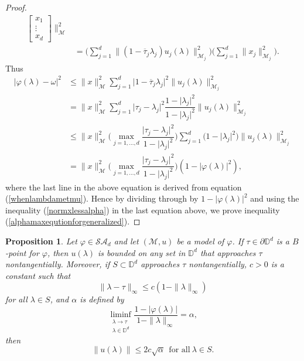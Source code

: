 \documentclass[11pt, reqno]{amsart}
\newtheorem{proposition}[theorem]{Proposition}
\newcommand\1{\boldsymbol {1}}
\numberwithin{equation}{section}
\begin{document}
\begin{proof}
\begin{align*}
\begin{bmatrix}
x_{1}\\
\vdots\\
x_{d}
\end{bmatrix}\Bigg\|^{2}_{\mathcal{M}}\\
 &=\bigg(\sum_{j=1}^{d}\|(1-\overline{\tau}_{j}\lambda_{j})u_{j}(\lambda)\|_{\mathcal{M}_{j}}^{2}\bigg)\bigg(\sum_{j=1}^{d}\|x_{j}\|_{\mathcal{M}_{j}}^{2}\bigg).
 \end{align*}
Thus
 \begin{align}\label{phi-omega}
 \lvert \varphi(\lambda)-\omega\rvert^{2}& \leq \|x\|_{\mathcal{M}}^{2}\sum_{j=1}^{d}\lvert 1-\overline{\tau}_{j}\lambda_{j}\rvert^{2}\|u_{j}(\lambda)\|_{\mathcal{M}_{j}}^{2}\nonumber\\
&= \|x\|_{\mathcal{M}}^{2}\sum_{j=1}^{d}\lvert \tau_{j}-\lambda_{j}\rvert^{2}\dfrac{1-\lvert \lambda_{j}\rvert^{2}}{1-\lvert \lambda_{j}\rvert^{2}}\|u_{j}(\lambda)\|_{\mathcal{M}_{j}}^{2}\nonumber\\
&\leq \|x\|_{\mathcal{M}}^{2}\bigg(\max_{j=1,\hdots,d}\dfrac{\lvert \tau_{j}-\lambda_{j}\rvert^{2}}{1-\lvert \lambda_{j}\rvert^{2}}\bigg)\sum_{j=1}^{d}\Big({1-\lvert \lambda_{j}\rvert^{2}}\Big)\|u_{j}(\lambda)\|_{\mathcal{M}_{j}}^{2}\nonumber\\
&=\|x\|_{\mathcal{M}}^{2}\bigg(\max_{j=1,\hdots,d}\dfrac{\lvert \tau_{j}-\lambda_{j}\rvert^{2}}{1-\lvert \lambda_{j}\rvert^{2}}\bigg)(1-\lvert \varphi(\lambda) \rvert^{2}),
\end{align}
where the last line in the above equation is derived from equation (\ref{whenlambdametmu}). Hence by dividing through by $1-\lvert\varphi(\lambda)\rvert^{2}$ and using the inequality (\ref{normxlessalpha}) in the last equation above, we prove inequality (\ref{alphamaxequtionforgeneralized}).\end{proof}

\begin{proposition}\label{prop5.4}
    Let $\varphi\in\mathcal{SA}_{d}$ and let $(\mathcal{M},u)$ be a model of $\varphi$. If $\tau\in\partial\mathbb{D}^{d}$ is a $B$-point for $\varphi$, then $u(\lambda)$ is bounded on any set in $\mathbb{D}^{d}$ that approaches $\tau$ nontangentially.
Moreover, if $S \subset \mathbb{D}^{d}$ approaches $\tau$ nontangentially,   $c>0$ is a constant such that 
$$\|\lambda-\tau\|_{\infty} \leq c(1-\|\lambda\|_{\infty})$$
for all $\lambda\in S$, and $\alpha$ is defined by 
    $$\liminf_{\substack{\lambda\rightarrow \tau \\ \lambda\in\mathbb{D}^{d}}} \dfrac{1-\lvert \varphi(\lambda) \rvert}{1-\|\lambda\|_{\infty}}=\alpha,$$
then
$$\|u(\lambda)\|\leq 2c\sqrt{\alpha}~~\text{for all}~\lambda\in S.$$
\end{proposition}
\end{document}
